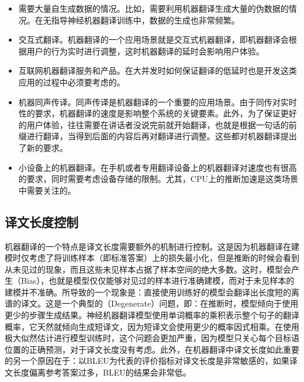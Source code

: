 \begin{itemize}
\vspace{0.5em}
\item 需要大量自生成数据的情况。比如，需要利用机器翻译生成大量的伪数据的情况。在无指导神经机器翻译训练中，数据的生成也非常频繁。
\vspace{0.5em}
\item 交互式翻译。机器翻译的一个应用场景就是交互式机器翻译\cite{Domingo2017Segment,Alvaro2017Interactive,DBLP:conf/emnlp/NepveuLLF04}，即机器翻译会根据用户的行为实时进行调整，这时机器翻译的延时会影响用户体验。
\vspace{0.5em}
\item 互联网机器翻译服务和产品。在大并发时如何保证翻译的低延时也是开发这类应用的过程中必须要考虑的。
\vspace{0.5em}
\item 机器同声传译。同声传译是机器翻译的一个重要的应用场景。由于同传对实时性的要求，机器翻译的速度是影响整个系统的关键要素。此外，为了保证更好的用户体验，往往需要在讲话者没说完前就开始翻译，也就是根据一句话的前缀进行翻译，当得到后面的内容后再对翻译进行调整。这些都对机器翻译提出了新的要求\cite{DBLP:journals/corr/abs-1810-08398}。
\vspace{0.5em}
\item 小设备上的机器翻译。在手机或者专用翻译设备上的机器翻译对速度也有很高的要求，同时需要考虑设备存储的限制。尤其，CPU上的推断加速是这类场景中需要关注的。
\vspace{0.5em}
\end{itemize}


\subsection{译文长度控制}

\parinterval 机器翻译的一个特点是译文长度需要额外的机制进行控制。这是因为机器翻译在建模时仅考虑了将训练样本（即标准答案）上的损失最小化，但是推断的时候会看到从未见过的现象，而且这些未见样本占据了样本空间的绝大多数。这时，模型会产生{\small{}}（Bias），也就是模型仅仅能够对见过的样本进行准确建模，而对于未见样本的建模并不准确。所导致的一个现象是：直接使用训练好的模型会翻译出长度短的离谱的译文。这是一个典型的{\small{}}（Degenerate）问题，即：在推断时，模型倾向于使用更少的步骤生成结果。神经机器翻译模型使用单词概率的乘积表示整个句子的翻译概率，它天然就倾向生成短译文，因为短译文会使用更少的概率因式相乘。在使用极大似然估计进行模型训练时，这个问题会更加严重，因为模型只关心每个目标语位置的正确预测，对于译文长度没有考虑。此外，在机器翻译中译文长度如此重要的另一个原因在于：以BLEU为代表的评价指标对译文长度是非常敏感的，如果译文长度偏离参考答案过多，BLEU的结果会非常低。

